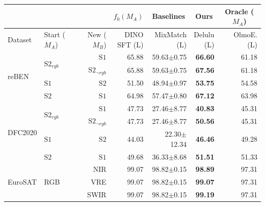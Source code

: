 \bigskip

\begin{tabular}{llr | r r r r}
\toprule
\multicolumn{3}{c}{} & \multicolumn{1}{c|}{$f_0(M_A)$} & \multicolumn{1}{c|}{Baselines} & \multicolumn{1}{c|}{Ours} & \multicolumn{1}{c}{Oracle ($M_A$)} \\
\midrule
Dataset & \shortstack[c]{Start\\($M_A$)} & \shortstack[c]{New\\($M_B$)} & \shortstack[c]{DINO\\SFT (L)} & \shortstack[c]{MixMatch\\(L)} & \shortstack[c]{Delulu\\(L)} & \shortstack[c]{OlmoE.\\(L)} \\
\midrule
  \multirow{4}{*}{reBEN} & \multirow{2}{*}{$\mathrm{S2}_{rgb}$} & $\mathrm{S1}$ & 65.88 & 59.63$\pm$0.75 & \textbf{66.60} & 61.18 \\
   &  & $\mathrm{S2}_{\neg rgb}$ & 65.88 & 59.63$\pm$0.75 & \textbf{67.56} & 61.18 \\
   & $\mathrm{S1}$ & $\mathrm{S2}$ & 51.50 & 48.94$\pm$0.97 & \textbf{53.75} & 54.58 \\
   & $\mathrm{S2}$ & $\mathrm{S1}$ & 64.98 & 57.47$\pm$0.80 & \textbf{67.12} & 63.98 \\
  \midrule
  \multirow{4}{*}{DFC2020} & \multirow{2}{*}{$\mathrm{S2}_{rgb}$} & $\mathrm{S1}$ & 47.73 & 27.46$\pm$8.77 & \textbf{40.83} & 45.31 \\
   &  & $\mathrm{S2}_{\neg rgb}$ & 47.73 & 27.46$\pm$8.77 & \textbf{50.56} & 45.31 \\
   & $\mathrm{S1}$ & $\mathrm{S2}$ & 44.03 & 22.30$\pm$12.34 & \textbf{46.46} & 49.28 \\
   & $\mathrm{S2}$ & $\mathrm{S1}$ & 49.68 & 36.33$\pm$8.68 & \textbf{51.51} & 51.33 \\
  \midrule
  \multirow{3}{*}{EuroSAT} & \multirow{3}{*}{RGB} & NIR & 99.07 & 98.82$\pm$0.15 & \textbf{98.89} & 97.31 \\
   &  & VRE & 99.07 & 98.82$\pm$0.15 & \textbf{99.07} & 97.31 \\
   &  & SWIR & 99.07 & 98.82$\pm$0.15 & \textbf{99.19} & 97.31 \\
\bottomrule
\end{tabular}

\bigskip

